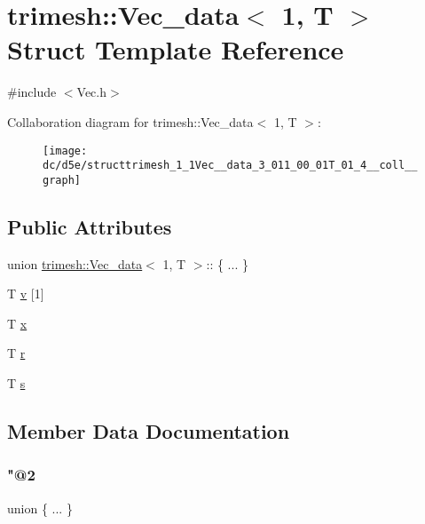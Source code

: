 \hypertarget{structtrimesh_1_1Vec__data_3_011_00_01T_01_4}{}\section{trimesh\+:\+:Vec\+\_\+data$<$ 1, T $>$ Struct Template Reference}
\label{structtrimesh_1_1Vec__data_3_011_00_01T_01_4}


{\ttfamily \#include $<$Vec.\+h$>$}



Collaboration diagram for trimesh\+:\+:Vec\+\_\+data$<$ 1, T $>$\+:\nopagebreak
\begin{figure}[H]
\begin{center}
\leavevmode
\texttt{[image: dc/d5e/structtrimesh\_1\_1Vec\_\_data\_3\_011\_00\_01T\_01\_4\_\_coll\_\_graph]}
\end{center}
\end{figure}
\subsection*{Public Attributes}
\begin{DoxyCompactItemize}
\item 
union \hyperlink{structtrimesh_1_1Vec__data}{trimesh\+::\+Vec\+\_\+data}$<$ 1, T $>$\+:: \{ ... \}  
\item 
T \hyperlink{structtrimesh_1_1Vec__data_3_011_00_01T_01_4_a41d1138a86ccd06df21c4dce9392cb1d}{v} \mbox{[}1\mbox{]}
\item 
T \hyperlink{structtrimesh_1_1Vec__data_3_011_00_01T_01_4_a3adca5743364447d65d3392ca7de30b9}{x}
\item 
T \hyperlink{structtrimesh_1_1Vec__data_3_011_00_01T_01_4_aa7602a68047e676e50bd46aa2f1a3973}{r}
\item 
T \hyperlink{structtrimesh_1_1Vec__data_3_011_00_01T_01_4_a6a8decccb8228cb923364d343d139ba6}{s}
\end{DoxyCompactItemize}


\subsection{Member Data Documentation}
\mbox{\label{structtrimesh_1_1Vec__data_3_011_00_01T_01_4_ae78d344b3991dd5e750ffa88bfccfaff}} 
\subsubsection{\texorpdfstring{"@2}{@2}}
{\footnotesize\ttfamily union \{ ... \} }

